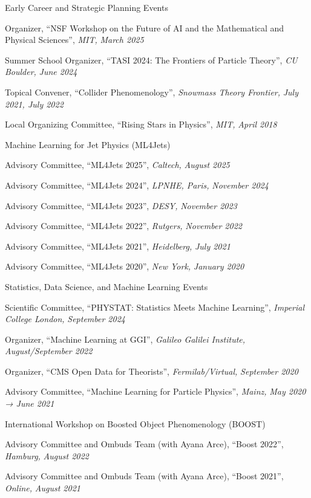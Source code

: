 \item Early Career and Strategic Planning Events
\bsbl 
\item Organizer, ``NSF Workshop on the Future of AI and the Mathematical and Physical Sciences'', \emph{MIT, }\emph{March 2025}
\item Summer School Organizer, ``TASI 2024: The Frontiers of Particle Theory'', \emph{CU Boulder, }\emph{June 2024}
\item Topical Convener, ``Collider Phenomenology'', \emph{Snowmass Theory Frontier, }\emph{July 2021, July 2022}
\item Local Organizing Committee, ``Rising Stars in Physics'', \emph{MIT, }\emph{April 2018}
\el 
\item Machine Learning for Jet Physics (ML4Jets)
\bsbl 
\item Advisory Committee, ``ML4Jets 2025'', \emph{Caltech, }\emph{August 2025}
\item Advisory Committee, ``ML4Jets 2024'', \emph{LPNHE, Paris, }\emph{November 2024}
\item Advisory Committee, ``ML4Jets 2023'', \emph{DESY, }\emph{November 2023}
\item Advisory Committee, ``ML4Jets 2022'', \emph{Rutgers, }\emph{November 2022}
\item Advisory Committee, ``ML4Jets 2021'', \emph{Heidelberg, }\emph{July 2021}
\item Advisory Committee, ``ML4Jets 2020'', \emph{New York, }\emph{January 2020}
\el 
\item Statistics, Data Science, and Machine Learning Events
\bsbl 
\item Scientific Committee, ``PHYSTAT: Statistics Meets Machine Learning'', \emph{Imperial College London, }\emph{September 2024}
\item Organizer, ``Machine Learning at GGI'', \emph{Galileo Galilei Institute, }\emph{August/September 2022}
\item Organizer, ``CMS Open Data for Theorists'', \emph{Fermilab/Virtual, }\emph{September 2020}
\item Advisory Committee, ``Machine Learning for Particle Physics'', \emph{Mainz, }\emph{May 2020 → June 2021}
\el 
\item International Workshop on Boosted Object Phenomenology (BOOST)
\bsbl 
\item Advisory Committee and Ombuds Team (with Ayana Arce), ``Boost 2022'', \emph{Hamburg, }\emph{August 2022}
\item Advisory Committee and Ombuds Team (with Ayana Arce), ``Boost 2021'', \emph{Online, }\emph{August 2021}
